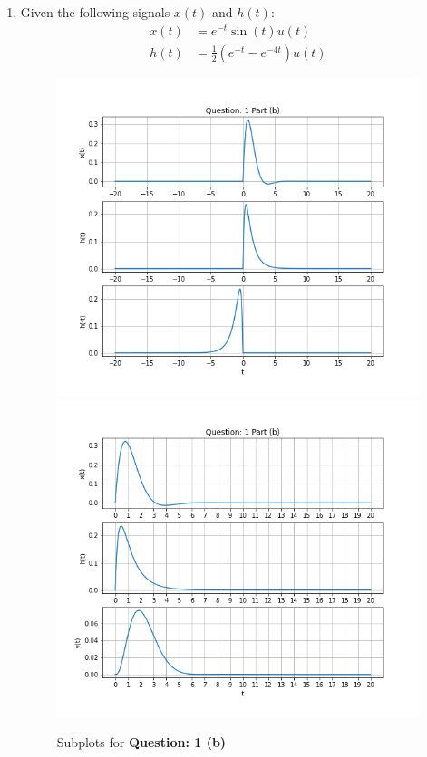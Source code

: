 \documentclass{article}
\begin{document}
\begin{enumerate}[label=(\alph*)]
        \item
        Given the following signals $x(t)$ and $h(t)$:
        \begin{align}
            x(t) &= e^{-t} \sin{(t)} u(t)  \\
            h(t) &= \frac{1}{2} \left( e^{-t} - e^{-4t} \right) u(t)
        \end{align}

        \begin{figure}[ht]
            \centering
            \includegraphics[scale=0.39]{./Assets/1-b-i.png}
            \includegraphics[scale=0.39]{./Assets/1-b-ii.png}
            \caption*{Subplots for \textbf{Question: 1 (b)}}
        \end{figure}
    \end{enumerate}
\end{document}
